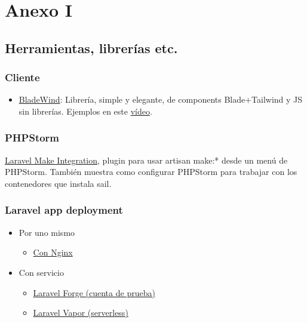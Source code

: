 \documentclass[11pt]{article}
\begin{document}
\newpage


\section{Anexo I}
\label{sec:org249b75a}
\subsection{Herramientas, librerías etc.}
\label{sec:orgdf0a724}
\subsubsection{Cliente}
\label{sec:orgbed5dc8}
\begin{itemize}
\item \href{https://bladewindui.com/}{BladeWind}: Librería, simple y elegante, de components
Blade+Tailwind y JS sin librerías. Ejemplos en este \href{https://www.youtube.com/watch?v=UoKa5aKkv1U}{vídeo}.
\end{itemize}

\subsubsection{PHPStorm}
\label{sec:orgf99cec5}
\href{https://github.com/NiclasvanEyk/jetbrains-laravel-make-integration/blob/main/docs/setup\_with\_sail.md}{Laravel Make Integration}, plugin para usar artisan make:* desde un
menú de PHPStorm. También muestra como configurar PHPStorm para
trabajar con los contenedores que instala sail.

\subsubsection{Laravel app deployment}
\label{sec:org381ef5d}
\begin{itemize}
\item Por uno mismo
\begin{itemize}
\item \href{https://laravel.com/docs/9.x/deployment}{Con Nginx}
\end{itemize}
\item Con servicio
\begin{itemize}
\item \href{https://bootcamp.laravel.com/deploying}{Laravel Forge (cuenta de prueba)}
\item \href{https://vapor.laravel.com/}{Laravel Vapor (serverless)}
\end{itemize}
\end{itemize}
\end{document}
